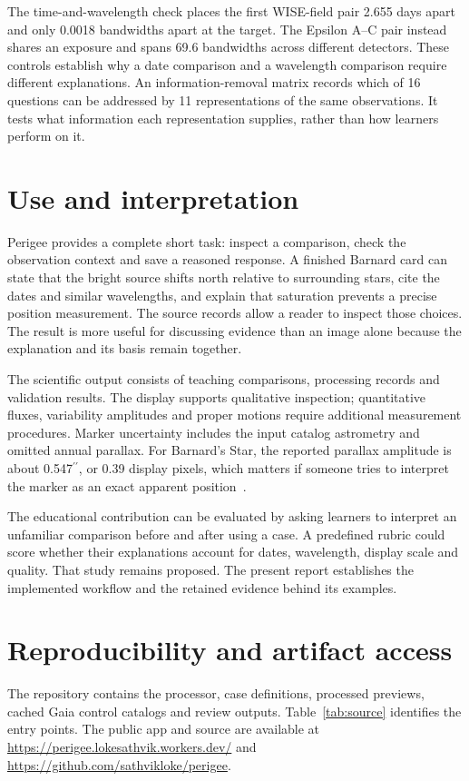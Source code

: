 \documentclass[11pt,letterpaper]{article}
\newcommand{\arcsec}{\ensuremath{^{\prime\prime}}}
\begin{document}
The time-and-wavelength check places the first WISE-field pair 2.655 days apart and only 0.0018 bandwidths apart at the target. The Epsilon A--C pair instead shares an exposure and spans 69.6 bandwidths across different detectors. These controls establish why a date comparison and a wavelength comparison require different explanations. An information-removal matrix records which of 16 questions can be addressed by 11 representations of the same observations. It tests what information each representation supplies, rather than how learners perform on it.

\section{Use and interpretation}
Perigee provides a complete short task: inspect a comparison, check the observation context and save a reasoned response. A finished Barnard card can state that the bright source shifts north relative to surrounding stars, cite the dates and similar wavelengths, and explain that saturation prevents a precise position measurement. The source records allow a reader to inspect those choices. The result is more useful for discussing evidence than an image alone because the explanation and its basis remain together.

The scientific output consists of teaching comparisons, processing records and validation results. The display supports qualitative inspection; quantitative fluxes, variability amplitudes and proper motions require additional measurement procedures. Marker uncertainty includes the input catalog astrometry and omitted annual parallax. For Barnard's Star, the reported parallax amplitude is about 0.547\arcsec, or 0.39 display pixels, which matters if someone tries to interpret the marker as an exact apparent position~\cite{registration}.

The educational contribution can be evaluated by asking learners to interpret an unfamiliar comparison before and after using a case. A predefined rubric could score whether their explanations account for dates, wavelength, display scale and quality. That study remains proposed. The present report establishes the implemented workflow and the retained evidence behind its examples.

\FloatBarrier
\section{Reproducibility and artifact access}
The repository contains the processor, case definitions, processed previews, cached Gaia control catalogs and review outputs. Table~\ref{tab:source} identifies the entry points. The public app and source are available at \url{https://perigee.lokesathvik.workers.dev/} and \url{https://github.com/sathvikloke/perigee}.
\end{document}
